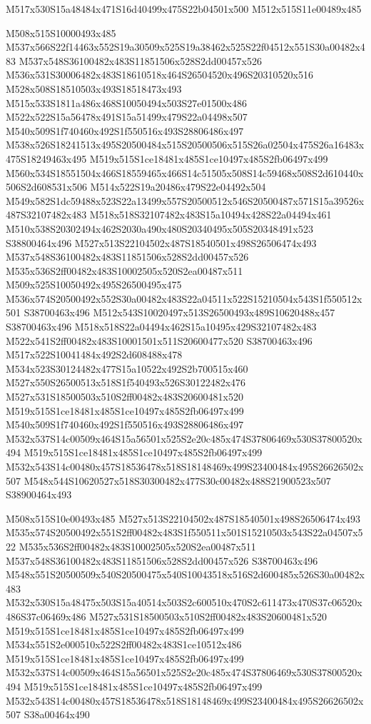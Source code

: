 \documentclass{article}
\begin{document}
\begin{multicols}{2}
\begin{center}
M517x530S15a48484x471S16d40499x475S22b04501x500 M512x515S11e00489x485 
\end{center}


M508x515S10000493x485 M537x566S22f14463x552S19a30509x525S19a38462x525S22f04512x551S30a00482x483 M537x548S36100482x483S11851506x528S2dd00457x526 M536x531S30006482x483S18610518x464S26504520x496S20310520x516 M528x508S18510503x493S18518473x493 M515x533S1811a486x468S10050494x503S27e01500x486 M522x522S15a56478x491S15a51499x479S22a04498x507 M540x509S1f740460x492S1f550516x493S28806486x497 M538x526S18241513x495S20500484x515S20500506x515S26a02504x475S26a16483x475S18249463x495 M519x515S1ce18481x485S1ce10497x485S2fb06497x499 M560x534S18551504x466S18559465x466S14c51505x508S14c59468x508S2d610440x506S2d608531x506 M514x522S19a20486x479S22e04492x504 M549x582S1dc59488x523S22a13499x557S20500512x546S20500487x571S15a39526x487S32107482x483 M518x518S32107482x483S15a10494x428S22a04494x461 M510x538S20302494x462S2030a490x480S20340495x505S20348491x523 S38800464x496 M527x513S22104502x487S18540501x498S26506474x493 M537x548S36100482x483S11851506x528S2dd00457x526 M535x536S2ff00482x483S10002505x520S2ea00487x511 M509x525S10050492x495S26500495x475 M536x574S20500492x552S30a00482x483S22a04511x522S15210504x543S1f550512x501 S38700463x496 M512x543S10020497x513S26500493x489S10620488x457 S38700463x496 M518x518S22a04494x462S15a10495x429S32107482x483 M522x541S2ff00482x483S10001501x511S20600477x520 S38700463x496 M517x522S10041484x492S2d608488x478 M534x523S30124482x477S15a10522x492S2b700515x460 M527x550S26500513x518S1f540493x526S30122482x476 M527x531S18500503x510S2ff00482x483S20600481x520 M519x515S1ce18481x485S1ce10497x485S2fb06497x499 M540x509S1f740460x492S1f550516x493S28806486x497 M532x537S14c00509x464S15a56501x525S2e20c485x474S37806469x530S37800520x494 M519x515S1ce18481x485S1ce10497x485S2fb06497x499 M532x543S14c00480x457S18536478x518S18148469x499S23400484x495S26626502x507 M548x544S10620527x518S30300482x477S30c00482x488S21900523x507 S38900464x493

M508x515S10e00493x485 M527x513S22104502x487S18540501x498S26506474x493 M535x574S20500492x551S2ff00482x483S1f550511x501S15210503x543S22a04507x522 M535x536S2ff00482x483S10002505x520S2ea00487x511 M537x548S36100482x483S11851506x528S2dd00457x526 S38700463x496 M548x551S20500509x540S20500475x540S10043518x516S2d600485x526S30a00482x483 M532x530S15a48475x503S15a40514x503S2c600510x470S2c611473x470S37c06520x486S37c06469x486 M527x531S18500503x510S2ff00482x483S20600481x520 M519x515S1ce18481x485S1ce10497x485S2fb06497x499 M534x551S2e000510x522S2ff00482x483S1ce10512x486 M519x515S1ce18481x485S1ce10497x485S2fb06497x499 M532x537S14c00509x464S15a56501x525S2e20c485x474S37806469x530S37800520x494 M519x515S1ce18481x485S1ce10497x485S2fb06497x499 M532x543S14c00480x457S18536478x518S18148469x499S23400484x495S26626502x507 S38a00464x490


\end{multicols}
\end{document}

